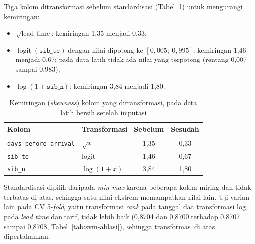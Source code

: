 Tiga kolom ditransformasi sebelum standardisasi (Tabel~\ref{tab:svm-transformasi}) untuk mengurangi kemiringan:
\begin{itemize}
	\item $\sqrt{\text{lead time}}$: kemiringan 1,35 menjadi 0,33;
	\item $\operatorname{logit}(\texttt{sib\_te})$ dengan nilai dipotong ke $[0{,}005;\ 0{,}995]$: kemiringan 1,46 menjadi 0,67; pada data latih tidak ada nilai yang terpotong (rentang 0,007 sampai 0,983);
	\item $\log(1 + \texttt{sib\_n})$: kemiringan 3,84 menjadi 1,80.
\end{itemize}

\begin{table}[H]
	\centering
	\caption{Kemiringan (\textit{skewness}) kolom yang ditransformasi, pada data latih bersih setelah imputasi}
	\label{tab:svm-transformasi}
	\small
	\begin{tabular}{l l c c}
		\toprule
		\textbf{Kolom} & \textbf{Transformasi} & \textbf{Sebelum} & \textbf{Sesudah} \\
		\midrule
		\texttt{days\_before\_arrival} & $\sqrt{x}$ & 1,35 & 0,33 \\
		\texttt{sib\_te} & logit & 1,46 & 0,67 \\
		\texttt{sib\_n} & $\log(1+x)$ & 3,84 & 1,80 \\
		\bottomrule
	\end{tabular}
\end{table}

Standardisasi dipilih daripada \textit{min-max} karena beberapa kolom miring dan tidak terbatas di atas, sehingga satu nilai ekstrem memampatkan nilai lain. Uji varian lain pada CV 5-\textit{fold}, yaitu transformasi \textit{rank} pada tanggal dan transformasi log pada \textit{lead time} dan tarif, tidak lebih baik (0,8704 dan 0,8700 terhadap 0,8707 sampai 0,8708, Tabel~\ref{tab:svm-ablasi}), sehingga transformasi di atas dipertahankan.

